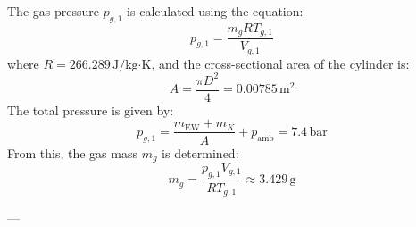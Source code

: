 The gas pressure \( p_{g,1} \) is calculated using the equation:  
\[
p_{g,1} = \frac{m_g R T_{g,1}}{V_{g,1}}
\]  
where \( R = 266.289 \, \text{J/kg·K} \), and the cross-sectional area of the cylinder is:  
\[
A = \frac{\pi D^2}{4} = 0.00785 \, \text{m}^2
\]  
The total pressure is given by:  
\[
p_{g,1} = \frac{m_{\text{EW}} + m_K}{A} + p_{\text{amb}} = 7.4 \, \text{bar}
\]  
From this, the gas mass \( m_g \) is determined:  
\[
m_g = \frac{p_{g,1} V_{g,1}}{R T_{g,1}} \approx 3.429 \, \text{g}
\]  

---